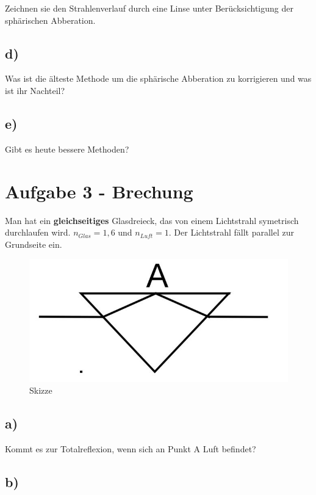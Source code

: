 Zeichnen sie den Strahlenverlauf durch eine Linse unter Berücksichtigung der sphärischen Abberation.

\subsection*{d)}

Was ist die älteste Methode um die sphärische Abberation zu korrigieren und was ist ihr Nachteil?

\subsection*{e)}

Gibt es heute bessere Methoden?


\section{Aufgabe 3 - Brechung}

Man hat ein \textbf{gleichseitiges} Glasdreieck, das von einem Lichtstrahl symetrisch durchlaufen wird. $n_{Glas} = 1,6$ und $n_{Luft} = 1$. Der Lichtstrahl fällt parallel zur Grundseite ein.


\begin{figure}[h]
	\centering
	\includegraphics[scale=0.5]{A3_1.jpg}
	\caption{Skizze}
\end{figure}

\subsection*{a)}

Kommt es zur Totalreflexion, wenn sich an Punkt A Luft befindet?

\subsection*{b)}

